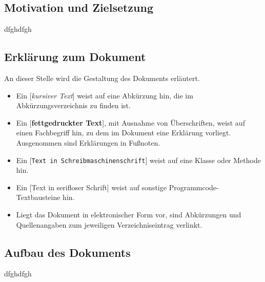 \endgroup

\subsection{Motivation und Zielsetzung}
\label{sub:Motivation und Zielsetzung}
dfghdfgh

\subsection{Erklärung zum Dokument}
\label{sub:Erklärung zum Dokument}
An dieser Stelle wird die Gestaltung des Dokuments erläutert.
\begin{itemize}[noitemsep]
    \item Ein {[\textit{kursiver Text}]} weist auf eine Abkürzung hin, die im Abkürzungsverzeichnis zu finden ist.
    \item Ein {[\textbf{fettgedruckter Text}]}, mit Ausnahme von Überschriften, weist auf einen Fachbegriff hin, zu dem im Dokument
    eine Erklärung vorliegt. Ausgenommen sind Erklärungen in Fußnoten.
    \item Ein {[\texttt{Text in Schreibmaschinenschrift}]} weist auf eine Klasse oder Methode hin.
    \item Ein {[\textsf{Text in serifloser Schrift}]} weist auf sonstige Programmcode-Textbausteine hin.
    \item Liegt das Dokument in elektronischer Form vor, sind Abkürzungen und Quellenangaben zum jeweiligen Verzeichniseintrag
    verlinkt.
\end{itemize}

\subsection{Aufbau des Dokuments}
\label{sub:Aufbau des Dokuments}
dfghdfgh

